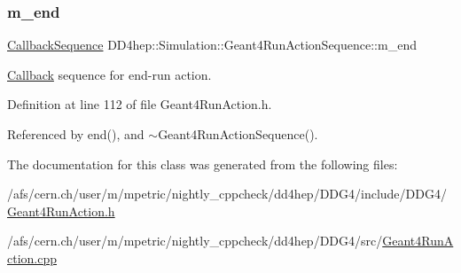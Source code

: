 \subsubsection{\texorpdfstring{m\+\_\+end}{m\_end}}
{\footnotesize\ttfamily \hyperlink{struct_d_d4hep_1_1_callback_sequence}{Callback\+Sequence} D\+D4hep\+::\+Simulation\+::\+Geant4\+Run\+Action\+Sequence\+::m\+\_\+end\hspace{0.3cm}{\ttfamily [protected]}}



\hyperlink{class_d_d4hep_1_1_callback}{Callback} sequence for end-\/run action. 



Definition at line 112 of file Geant4\+Run\+Action.\+h.



Referenced by end(), and $\sim$\+Geant4\+Run\+Action\+Sequence().



The documentation for this class was generated from the following files\+:\begin{DoxyCompactItemize}
\item 
/afs/cern.\+ch/user/m/mpetric/nightly\+\_\+cppcheck/dd4hep/\+D\+D\+G4/include/\+D\+D\+G4/\hyperlink{_geant4_run_action_8h}{Geant4\+Run\+Action.\+h}\item 
/afs/cern.\+ch/user/m/mpetric/nightly\+\_\+cppcheck/dd4hep/\+D\+D\+G4/src/\hyperlink{_geant4_run_action_8cpp}{Geant4\+Run\+Action.\+cpp}\end{DoxyCompactItemize}
